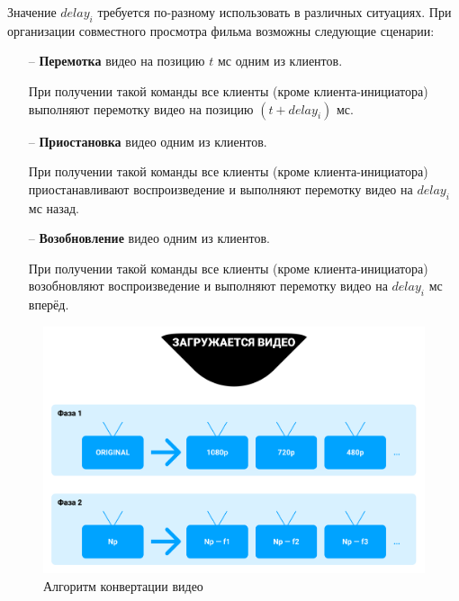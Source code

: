 Значение \(delay_i\) требуется по-разному использовать в различных ситуациях.
При организации совместного просмотра фильма возможны следующие сценарии:
\begin{itemize}
    \item[--] \textbf{Перемотка} видео на позицию \(t\) мс одним из клиентов.

    При получении такой команды все клиенты (кроме клиента-инициатора) выполняют перемотку видео на позицию \((t + delay_i)\) мс.
    \item[--] \textbf{Приостановка} видео одним из клиентов.

    При получении такой команды все клиенты (кроме клиента-инициатора) приостанавливают воспроизведение и выполняют перемотку видео на \(delay_i\) мс назад.
    \item[--] \textbf{Возобновление} видео одним из клиентов.

    При получении такой команды все клиенты (кроме клиента-инициатора) возобновляют воспроизведение и выполняют перемотку видео на \(delay_i\) мс вперёд.
\end{itemize}

\begin{figure}[p]
    \centering
    \includegraphics[width=0.97\linewidth]{../images/server_converting.png}
    \caption{Алгоритм конвертации видео}
    \label{ris:server_converting}
\end{figure}

